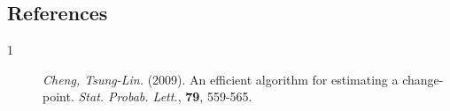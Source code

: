 \documentclass[12pt]{article}
\begin{document}
%
%
%

\subsection*{References}

\begin{description}

\item[1]{\em Cheng, Tsung-Lin.} (2009). An efficient algorithm for
estimating a change-point. {\em Stat. Probab. Lett.}, {\bf79},
559-565.

\end{description}
\end{document}
